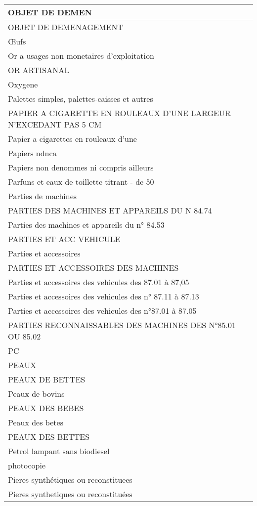 \documentclass[
]{book}
\begin{document}
\begin{table}
\begin{tabular}[t]{l}
\hline
OBJET DE DEMEN\\
\hline
OBJET DE DEMENAGEMENT\\
\hline
Œufs\\
\hline
Or a usages non monetaires d'exploitation\\
\hline
OR ARTISANAL\\
\hline
Oxygene\\
\hline
Palettes simples, palettes-caisses et autres\\
\hline
PAPIER A CIGARETTE EN ROULEAUX D'UNE LARGEUR N'EXCEDANT PAS 5 CM\\
\hline
Papier a cigarettes en rouleaux d'une\\
\hline
Papiers ndnca\\
\hline
Papiers non denommes ni compris ailleurs\\
\hline
Parfuns et eaux de toillette titrant - de 50\\
\hline
Parties de machines\\
\hline
PARTIES DES MACHINES ET APPAREILS DU N 84.74\\
\hline
Parties des machines et appareils du n° 84.53\\
\hline
PARTIES ET ACC VEHICULE\\
\hline
Parties et accessoires\\
\hline
PARTIES ET ACCESSOIRES DES MACHINES\\
\hline
Parties et accessoires des vehicules  des 87.01 à 87,05\\
\hline
Parties et accessoires des vehicules des n° 87.11 à 87.13\\
\hline
Parties et accessoires des vehicules des n°87.01 à 87.05\\
\hline
PARTIES RECONNAISSABLES DES MACHINES DES N°85.01 OU 85.02\\
\hline
PC\\
\hline
PEAUX\\
\hline
PEAUX DE BETTES\\
\hline
Peaux de bovins\\
\hline
PEAUX DES BEBES\\
\hline
Peaux des betes\\
\hline
PEAUX DES BETTES\\
\hline
Petrol lampant sans biodiesel\\
\hline
photocopie\\
\hline
Pieres synthétiques ou reconstituees\\
\hline
Pieres synthetiques ou reconstituées\\
\hline

\end{tabular}
\end{table}
\end{document}
